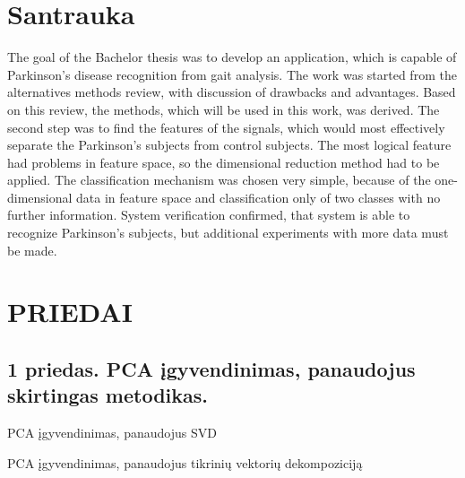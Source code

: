 \documentclass[]{vgtuef}
\begin{document}
\renewcommand\refname{Literatūros ir informacinių šaltinių sąrašas}




\section*{Santrauka}

The goal of the Bachelor thesis was to develop an application, which is capable of Parkinson's disease recognition from gait analysis. The work was started from the alternatives methods review, with discussion of drawbacks and advantages. Based on this review, the methods, which will be used in this work, was derived. The second step was to find the features of the signals, which would most effectively separate the Parkinson's subjects from control subjects. The most logical feature had problems in feature space, so the dimensional reduction method had to be applied. The classification mechanism was chosen very simple, because of the one-dimensional data in feature space and classification only of two classes with no further information. System verification confirmed, that system is able to recognize Parkinson's subjects, but additional experiments with more data must be made.

\section*{PRIEDAI}

\subsection*{1 priedas. PCA įgyvendinimas, panaudojus skirtingas metodikas.}
\label{subsec:pca_source}

\begin{cfigure}[!h]
  \centering
  \caption{PCA įgyvendinimas, panaudojus SVD}
  \label{code:pca_svd}
  
\end{cfigure}

\begin{cfigure}[H]
  \centering
  \caption{PCA įgyvendinimas, panaudojus tikrinių vektorių dekompoziciją}
  \label{code:pca_eig}
  
\end{cfigure}
\end{document}
